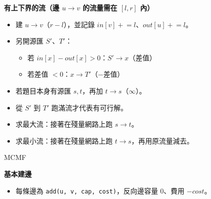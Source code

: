 {\large\bfseries 有上下界的流（邊 $u \to v$ 的流量需在 $[l, r]$ 內）\par}
\medskip
\begin{itemize}
  \item 建 $u \to v$（$r - l$），並記錄 $in[v] \mathrel{+}= l$、$out[u] \mathrel{+}= l$。
  \item 另開源匯 $S'$、$T'$：
  \begin{itemize}
    \item 若 $in[x] - out[x] > 0$：$S' \to x$（差值）
    \item 若差值 $< 0$：$x \to T'$（$-$差值）
  \end{itemize}
  \item 若題目本身有源匯 $s, t$，再加 $t \to s$（$\infty$）。
  \item 從 $S'$ 到 $T'$ 跑滿流才代表有可行解。
  \item 求最大流：接著在殘量網路上跑 $s \to t$。
  \item 求最小流：接著在殘量網路上跑 $t \to s$，再用原流量減去。
\end{itemize}

\setlength{\parindent}{0em}

{\Large MCMF}
\medskip

\setlength{\parindent}{2em}

{\large\bfseries 基本建邊\par}
\medskip
\begin{itemize}
    \item 每條邊為 \texttt{add(u, v, cap, cost)}，反向邊容量 $0$、費用 $-cost$。
\end{itemize}

